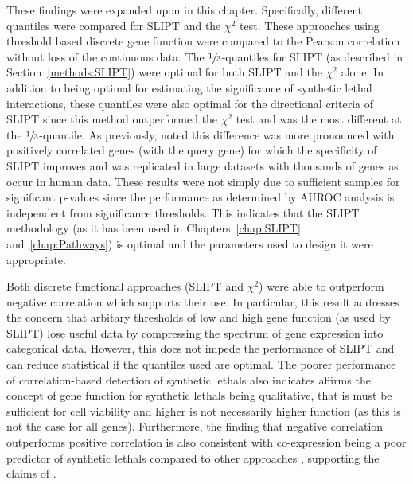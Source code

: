 These findings were expanded upon in this chapter. Specifically, different quantiles were compared for \gls{SLIPT} and the $\chi^2$ test. These approaches using threshold based discrete gene function were compared to the Pearson correlation without loss of the continuous  data. The $\sfrac{1}{3}$-quantiles for \gls{SLIPT} (as described in Section~\ref{methods:SLIPT}) were optimal for both \gls{SLIPT} and the $\chi^2$ alone. In addition to being optimal for estimating the significance of \gls{synthetic lethal} interactions, these quantiles were also optimal for the directional criteria of \gls{SLIPT} since this method outperformed the $\chi^2$ test and was the most different at the $\sfrac{1}{3}$-quantile. As previously, noted this difference was more pronounced with positively correlated genes (with the query gene) for which the specificity of \gls{SLIPT} improves and was replicated in large datasets with thousands of genes as occur in human  data. These results were not simply due to sufficient samples for significant p-values since the performance as determined by \gls{AUROC} analysis is independent from significance thresholds. This indicates that the \gls{SLIPT} methodology (as it has been used in Chapters~\ref{chap:SLIPT} and~\ref{chap:Pathways}) is optimal and the parameters used to design it were appropriate.

Both discrete functional approaches (\gls{SLIPT} and $\chi^2$) were able to outperform negative correlation which supports their use. In particular, this result addresses the concern that arbitary thresholds of low and high gene function (as used by \gls{SLIPT}) lose useful data by compressing the spectrum of \gls{gene expression} into categorical data. However, this does not impede the performance of \gls{SLIPT} and can reduce statistical if the quantiles used are optimal. The poorer performance of correlation-based detection of \glspl{synthetic lethal} also indicates affirms the concept of gene function for \glspl{synthetic lethal} being qualitative, that is  must be sufficient for cell viability and higher  is not necessarily higher function (as this is not the case for all genes). Furthermore, the finding that negative correlation outperforms positive correlation is also consistent with co-expression being a poor predictor of \glspl{synthetic lethal} compared to other approaches \citep{Jerby2014}, supporting the claims of \citet{Lu2015}.

